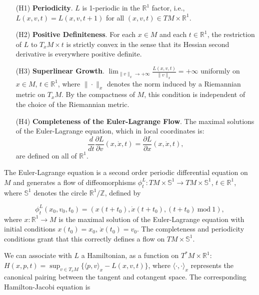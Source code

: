 \documentclass{amsart}[12pt]
\theoremstyle{definition}
\theoremstyle{remark}
\numberwithin{equation}{section}
\begin{document}
\vskip0.2cm
\begin{itemize}
    \item [(H1)] \textbf{Periodicity}. $L$ is 1-periodic in the
                 $\mathbb{R}^1$ factor, i.e.,
                 $L(x,v,t)=L(x,v,t+1)$ for all $(x,v,t)\in TM\times\mathbb{R}^1$.
    \item [(H2)] \textbf{Positive Definiteness}. For each $x\in M$ and each
                 $t\in\mathbb{R}^1$, the restriction of $L$ to $T_xM\times
                 t$ is strictly convex in the sense that its
                 Hessian second derivative is everywhere positive
                 definite.
    \item [(H3)] \textbf{Superlinear Growth}.
                 $\lim_{\|v\|_x\to+\infty}\frac{L(x,v,t)}{\|v\|_x}=+\infty$
                 uniformly on $x\in M$, $t\in\mathbb{R}^1$,
                 where $\|\cdot\|_x$ denotes the norm induced by a
                 Riemannian metric on $T_xM$. By the compactness
                 of $M$, this condition is
                 independent of the choice of the Riemannian
                 metric.
    \item [(H4)] \textbf{Completeness of the Euler-Lagrange Flow}.
                 The maximal solutions of the Euler-Lagrange
                 equation, which in local coordinates is:
                 \[
                 \frac{d}{dt}\frac{\partial L}{\partial
                 v}(x,\dot{x},t)=\frac{\partial L}{\partial
                 x}(x,\dot{x},t),
                 \]
                 are defined on all of $\mathbb{R}^1$.
\end{itemize}

\vskip0.2cm

The Euler-Lagrange equation is a second order periodic
differential equation on $M$ and generates a flow of
diffeomorphisms $\phi^L_t:TM\times\mathbb{S}^1\to
TM\times\mathbb{S}^1$, $t\in\mathbb{R}^1$, where $\mathbb{S}^1$
denotes the circle $\mathbb{R}^1/\mathbb{Z}$, defined by

\[
\phi^L_t(x_0,v_0,t_0)=(x(t+t_0),\dot{x}(t+t_0),(t+t_0)\
\mathrm{mod}\ 1),
\]
where $x:\mathbb{R}^1\to M$ is the maximal solution of the
Euler-Lagrange equation with initial conditions $x(t_0)=x_0$,
$\dot{x}(t_0)=v_0$. The completeness and periodicity conditions
grant that this correctly defines a flow on
$TM\times\mathbb{S}^1$.

We can associate with $L$ a Hamiltonian, as a function on
$T^*M\times\mathbb{R}^1$: $H(x,p,t)=\sup_{v\in T_xM}\{\langle
p,v\rangle_x-L(x,v,t)\}$, where $\langle \cdot,\cdot\rangle_x$
represents the canonical pairing between the tangent and cotangent
space. The corresponding Hamilton-Jacobi equation is
\end{document}

